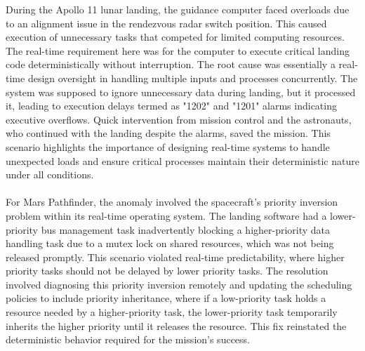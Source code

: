 \documentclass[a4paper,11pt]{article}%
\newenvironment{qanda}{\setlength{\parindent}{0pt}}{\bigskip}
\begin{document}
\begin{qanda}
\begin{enumerate}
\begin{enumerate}
				      During the Apollo 11 lunar landing, the guidance computer faced overloads due to an alignment issue in the rendezvous radar switch position. This caused execution of unnecessary tasks that competed for limited computing resources. The real-time requirement here was for the computer to execute critical landing code deterministically without interruption. The root cause was essentially a real-time design oversight in handling multiple inputs and processes concurrently. The system was supposed to ignore unnecessary data during landing, but it processed it, leading to execution delays termed as "1202" and "1201" alarms indicating executive overflows. Quick intervention from mission control and the astronauts, who continued with the landing despite the alarms, saved the mission. This scenario highlights the importance of designing real-time systems to handle unexpected loads and ensure critical processes maintain their deterministic nature under all conditions.\\\\

				      For Mars Pathfinder, the anomaly involved the spacecraft’s priority inversion problem within its real-time operating system. The landing software had a lower-priority bus management task inadvertently blocking a higher-priority data handling task due to a mutex lock on shared resources, which was not being released promptly. This scenario violated real-time predictability, where higher priority tasks should not be delayed by lower priority tasks. The resolution involved diagnosing this priority inversion remotely and updating the scheduling policies to include priority inheritance, where if a low-priority task holds a resource needed by a higher-priority task, the lower-priority task temporarily inherits the higher priority until it releases the resource. This fix reinstated the deterministic behavior required for the mission's success.
			\end{enumerate}
	\end{enumerate}


\end{qanda}
\end{document}
